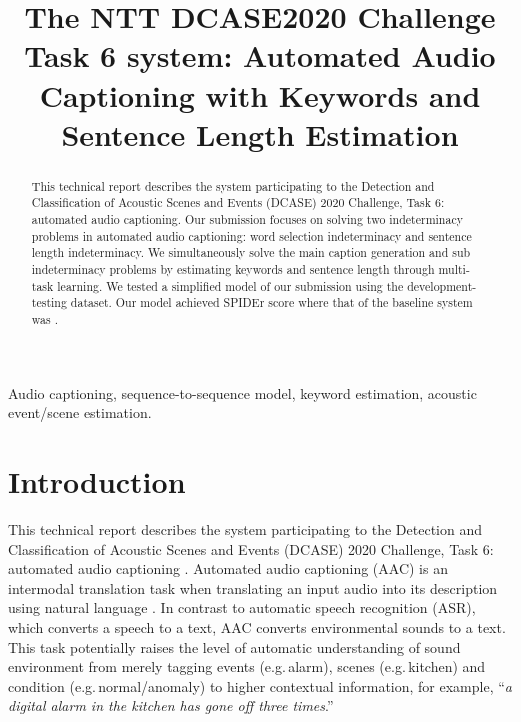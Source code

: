 \documentclass{article}
\title{The NTT DCASE2020 Challenge Task 6 system: Automated Audio Captioning with Keywords and Sentence Length Estimation}
\begin{document}
\ninept
\maketitle

\begin{sloppy}

\begin{abstract}
This technical report describes the system participating to the Detection and Classification of Acoustic Scenes and Events (DCASE) 2020 Challenge, Task 6: automated audio captioning. Our submission focuses on solving two indeterminacy problems in automated audio captioning: word selection indeterminacy and sentence length indeterminacy. We simultaneously solve the main caption generation and sub indeterminacy problems by estimating keywords and sentence length through multi-task learning. We tested a simplified model of our submission using the development-testing dataset. Our model achieved  SPIDEr score where that of the baseline system was .
\end{abstract}

\begin{keywords}
Audio captioning, sequence-to-sequence model, keyword estimation, acoustic event/scene estimation.
\end{keywords}


\section{Introduction}
\label{sec:intro}

This technical report describes the system participating to the Detection and Classification of Acoustic Scenes and Events (DCASE) 2020 Challenge, Task 6: automated audio captioning \cite{task}.
Automated audio captioning (AAC) is an intermodal translation task when translating an input audio into its description using natural language \cite{ac1,ac2,ac3,audiocaps,clotho}. In contrast to automatic speech recognition (ASR), which converts a speech to a text, AAC converts environmental sounds to a text. This task potentially raises the level of automatic understanding of sound environment from merely tagging events \cite{aed,aed2} (e.g.\,alarm), scenes \cite{asc} (e.g.\,kitchen) and condition \cite{asd} (e.g.\,normal/anomaly) to higher contextual information, for example, ``{\it a digital alarm in the kitchen has gone off three times}.''


\end{sloppy}
\end{document}
